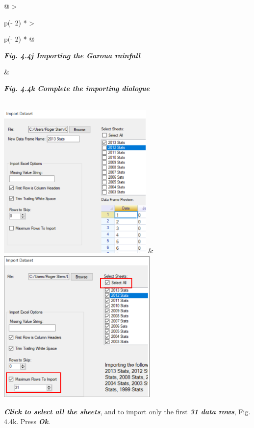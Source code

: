 \documentclass[
  letterpaper,
  DIV=11,
  numbers=noendperiod]{scrreprt}
\begin{document}
\begin{longtable}[]{@{}
  >{\raggedright\arraybackslash}p{(\columnwidth - 2\tabcolsep) * }
  >{\raggedright\arraybackslash}p{(\columnwidth - 2\tabcolsep) * }@{}}
\toprule\noalign{}
\begin{minipage}[b]{\linewidth}\raggedright
\textbf{\emph{Fig. 4.4j Importing the Garoua rainfall}}
\end{minipage} & \begin{minipage}[b]{\linewidth}\raggedright
\textbf{\emph{Fig. 4.4k Complete the importing dialogue}}
\end{minipage} \\
\midrule\noalign{}
\endhead
\bottomrule\noalign{}
\endlastfoot
\includegraphics[width=3.01272in,height=3.05008in]{figures/Fig4.4j.png}
&
\includegraphics[width=3.09552in,height=3.03215in]{figures/Fig4.4k.png} \\
\end{longtable}

\textbf{\emph{Click to select all the sheets}}, and to import only the
first \textbf{\emph{31 data rows}}, Fig. 4.4k. Press \textbf{\emph{Ok}}.
\end{document}
